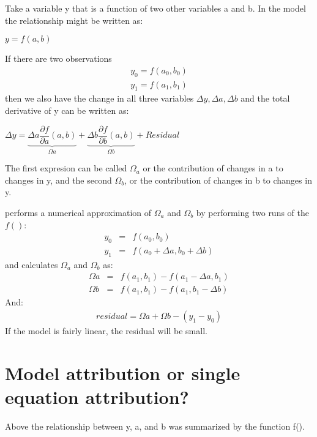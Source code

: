 \documentclass[letterpaper,10pt,english]{jupyterBook}
\begin{document}
\sphinxAtStartPar
Take a variable y that is a function of two other variables a and b.  In the model the relationship might be written as:

\sphinxAtStartPar
\(y = f(a,b)\)

\sphinxAtStartPar
If there are two observations
\label{equation:content/06_ModelAnalytics/Attribution:d704f437-36a8-4771-9c7d-deb693d4baca}\begin{eqnarray}
y_0 = f(a_0,b_0)\\
y_1 = f(a_1,b_1)
\end{eqnarray}
\sphinxAtStartPar
then we also have the change in all three variables \(\Delta y, \Delta a, \Delta b\) and the total derivative of y can be written as:

\sphinxAtStartPar
\(\Delta y = \underbrace{\Delta a \dfrac{\partial {f}}{\partial{a}}(a,b)}_{\Omega a} + 
\underbrace{\Delta b \dfrac{\partial {f}}{\partial{b}}(a,b)}_{\Omega b}+Residual\)

\sphinxAtStartPar
The first expresion can be called \(\Omega_a\) or the contribution of changes in a to changes in y, and the second \(\Omega_b\),  or the contribution of changes in b to changes in y.

\sphinxAtStartPar
{} performs a numerical approximation of \(\Omega_a\) and \(\Omega_b\) by performing two runs of the \(f()\):
\label{equation:content/06_ModelAnalytics/Attribution:675e70b5-c8ce-4a2f-ba07-1d815e73907d}\begin{eqnarray}  
y_0&=&f(a_{0},b_{0}) \\
y_1&=&f(a_0+\Delta a,b_{0}+ \Delta b)
\end{eqnarray}
\sphinxAtStartPar
and calculates \(\Omega_a\) and \(\Omega_b\) as:
\label{equation:content/06_ModelAnalytics/Attribution:f732d6f2-2e26-4d9d-9e61-ff51d60c34ef}\begin{eqnarray}  
\Omega a&=&f(a_1,b_1 )-f(a_1-\Delta a,b_1) \\
\Omega b&=&f(a_1,b_1 )-f(a_1,b_1-\Delta  b)
\end{eqnarray}
\sphinxAtStartPar
And:
\label{equation:content/06_ModelAnalytics/Attribution:c88de322-9fdb-4e40-bc5e-043ffe657777}\begin{eqnarray}
residual = \Omega a + \Omega b -(y_1 - y_0) 
\end{eqnarray}
\sphinxAtStartPar
If the model is fairly linear, the residual will be small.


\section{Model attribution or  single equation attribution?}
\label{\detokenize{content/06_ModelAnalytics/Attribution:model-attribution-or-single-equation-attribution}}
\sphinxAtStartPar
Above the relationship between y, a, and b was summarized by the function f().
\end{document}
